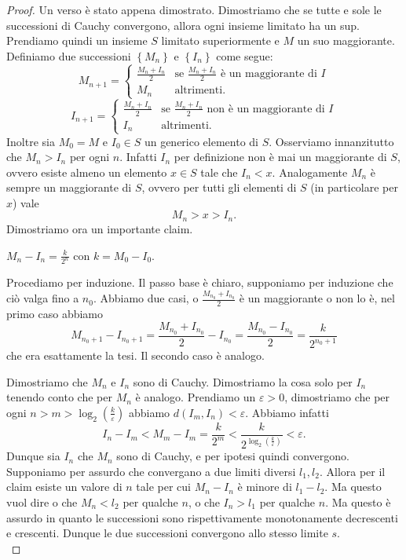 \documentclass[11pt]{scrartcl}
\begin{document}
	\begin{proof}
		Un verso è stato appena dimostrato. Dimostriamo che se tutte e sole le successioni di Cauchy convergono, allora ogni insieme limitato ha un sup. Prendiamo quindi un insieme $S$ limitato superiormente e $M$ un suo maggiorante. Definiamo due successioni $\left\{M_n\right\}$ e $\left\{I_n\right\}$ come segue:
		$$M_{n+1}=
		\begin{cases}
			\frac{M_n+I_n}{2} & \text{se $\frac{M_n+I_n}{2}$ è un maggiorante di  $I$}\\
			M_n & \text{altrimenti.} 
		\end{cases}
		$$
		$$I_{n+1}=
		\begin{cases}
			\frac{M_n+I_n}{2} & \text{se $\frac{M_n+I_n}{2}$ non è un maggiorante di  $I$}\\
			I_n & \text{altrimenti.}
		\end{cases}
		$$
		Inoltre sia $M_0=M$ e $I_0\in S$ un generico elemento di $S$. Osserviamo innanzitutto che $M_n>I_n$ per ogni $n$. Infatti $I_n$ per definizione non è mai un maggiorante di $S$, ovvero esiste almeno un elemento $x\in S$ tale che $I_n<x$. Analogamente $M_n$ è sempre un maggiorante di $S$, ovvero per tutti gli elementi di $S$ (in particolare per $x$) vale 
		$$M_n>x>I_n.$$
		Dimostriamo ora un importante claim.
		\begin{claim}
			$M_n-I_n=\frac{k}{2^n}$ con $k=M_0-I_0$.
		\end{claim}
		\begin{subproof}
			Procediamo per induzione. Il passo base è chiaro, supponiamo per induzione che ciò valga fino a $n_0$. Abbiamo due casi, o $\frac{M_{n_0}+I_{n_0}}{2}$ è un maggiorante o non lo è, nel primo caso abbiamo
			$$M_{n_0+1}-I_{n_0+1}=\frac{M_{n_0}+I_{n_0}}{2}-I_{n_0}=\frac{M_{n_0}-I_{n_0}}{2}=\frac{k}{2^{n_0+1}}$$
			che era esattamente la tesi. Il secondo caso è analogo. 
		\end{subproof}	
		Dimostriamo che $M_n$ e $I_n$ sono di Cauchy. Dimostriamo la cosa solo per $I_n$ tenendo conto che per $M_n$ è analogo. Prendiamo un $\varepsilon>0$, dimostriamo che per ogni $n>m> \log_2\left(\frac{k}{\varepsilon}\right)$ abbiamo $d(I_m,I_n)<\varepsilon$. Abbiamo infatti
		$$I_n-I_m<M_m-I_m=\frac{k}{2^{m}}<\frac{k}{2^{\log_2\left(\frac{k}{\varepsilon}\right)}}<\varepsilon.$$
		Dunque sia $I_n$ che $M_n$ sono di Cauchy, e per ipotesi quindi convergono. Supponiamo per assurdo che convergano a due limiti diversi $l_1,l_2$. Allora per il claim esiste un valore di $n$ tale per cui $M_n-I_n$ è minore di $l_1-l_2$. Ma questo vuol dire o che $M_n<l_2$ per qualche $n$, o che $I_n>l_1$ per qualche $n$. Ma questo è assurdo in quanto le successioni sono rispettivamente monotonamente decrescenti e crescenti. Dunque le due successioni convergono allo stesso limite $s$. \\

\end{proof}
\end{document}
